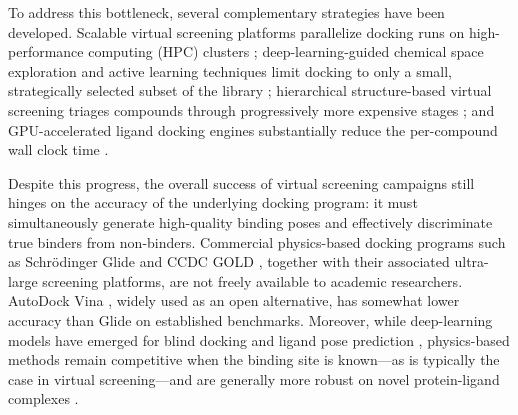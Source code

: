 \documentclass[11pt]{article}
\begin{document}
To address this bottleneck, several complementary strategies have been developed. Scalable virtual screening platforms parallelize docking runs on high-performance computing (HPC) clusters \citep{gorgulla2020open}; deep-learning-guided chemical space exploration and active learning techniques limit docking to only a small, strategically selected subset of the library \citep{graff2021accelerating,gentile2020deep,yang2021efficient,graff2022self}; hierarchical structure-based virtual screening triages compounds through progressively more expensive stages \citep{bender2021practical}; and GPU-accelerated ligand docking engines substantially reduce the per-compound wall clock time \citep{tang2022uniDock}.

Despite this progress, the overall success of virtual screening campaigns still hinges on the accuracy of the underlying docking program: it must simultaneously generate high-quality binding poses and effectively discriminate true binders from non-binders. Commercial physics-based docking programs such as Schr\"odinger Glide \citep{friesner2004glide,halgren2004glide,friesner2006extra} and CCDC GOLD \citep{jones1997development}, together with their associated ultra-large screening platforms, are not freely available to academic researchers. AutoDock Vina \citep{trott2010autodock}, widely used as an open alternative, has somewhat lower accuracy than Glide on established benchmarks. Moreover, while deep-learning models have emerged for blind docking and ligand pose prediction \citep{corso2023diffdock,stark2022equibind,lu2022tankbind,mendez2021deepdock,nakata2023end}, physics-based methods remain competitive when the binding site is known---as is typically the case in virtual screening---and are generally more robust on novel protein-ligand complexes \citep{buttenschoen2023poseBusters,yu2023deeplimit}.
\end{document}
